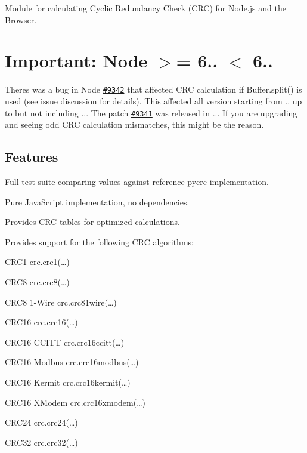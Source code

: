 \href{https://www.gittip.com/alexgorbatchev/}{\tt } \href{https://david-dm.org/alexgorbatchev/node-crc}{\tt } \href{https://david-dm.org/alexgorbatchev/node-crc?type=dev}{\tt } \href{https://travis-ci.org/alexgorbatchev/node-crc}{\tt }

\href{https://npmjs.org/package/crc}{\tt }

Module for calculating Cyclic Redundancy Check (C\+RC) for Node.\+js and the Browser.

\section*{Important\+: Node $>$= 6.. $<$ 6..}

There\textquotesingle{}s was a bug in Node \href{https://github.com/nodejs/node/issues/9342}{\tt \#9342} that affected C\+RC calculation if {\ttfamily Buffer.\+split()} is used (see issue discussion for details). This affected all version starting from {..} up to but not including {..}. The patch \href{https://github.com/nodejs/node/pull/9341}{\tt \#9341} was released in {..}. If you are upgrading and seeing odd C\+RC calculation mismatches, this might be the reason.

\subsection*{Features}


\begin{DoxyItemize}
\item Full test suite comparing values against reference {\ttfamily pycrc} implementation.
\item Pure Java\+Script implementation, no dependencies.
\item Provides C\+RC tables for optimized calculations.
\item Provides support for the following C\+RC algorithms\+:
\begin{DoxyItemize}
\item C\+R\+C1 {\ttfamily crc.\+crc1(…)}
\item C\+R\+C8 {\ttfamily crc.\+crc8(…)}
\item C\+R\+C8 1-\/\+Wire {\ttfamily crc.\+crc81wire(…)}
\item C\+R\+C16 {\ttfamily crc.\+crc16(…)}
\item C\+R\+C16 C\+C\+I\+TT {\ttfamily crc.\+crc16ccitt(…)}
\item C\+R\+C16 Modbus {\ttfamily crc.\+crc16modbus(…)}
\item C\+R\+C16 Kermit {\ttfamily crc.\+crc16kermit(…)}
\item C\+R\+C16 X\+Modem {\ttfamily crc.\+crc16xmodem(…)}
\item C\+R\+C24 {\ttfamily crc.\+crc24(…)}
\item C\+R\+C32 {\ttfamily crc.\+crc32(…)}
\end{DoxyItemize}
\end{DoxyItemize}

